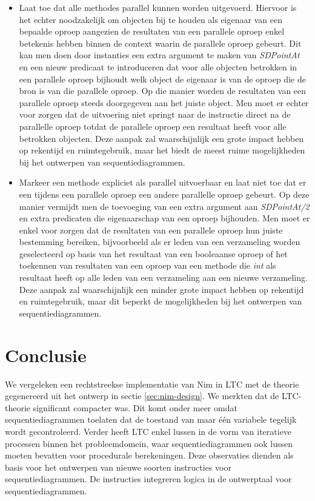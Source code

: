 \begin{itemize}
	\item Laat toe dat alle methodes parallel kunnen worden uitgevoerd. Hiervoor is het echter noodzakelijk om objecten bij te houden als eigenaar van een bepaalde oproep aangezien de resultaten van een parallele oproep enkel betekenis hebben binnen de context waarin de parallele oproep gebeurt. Dit kan men doen door instanties een extra argument te maken van \textit{SDPointAt} en een nieuw predicaat te introduceren dat voor alle objecten betrokken in een parallele oproep bijhoudt welk object de eigenaar is van de oproep die de bron is van die parallele oproep. Op die manier worden de resultaten van een parallele oproep steeds doorgegeven aan het juiste object. Men moet er echter voor zorgen dat de uitvoering niet springt naar de instructie direct na de parallelle oproep totdat de parallele oproep een resultaat heeft voor alle betrokken objecten. Deze aanpak zal waarschijnlijk een grote impact hebben op rekentijd en ruimtegebruik, maar het biedt de meest ruime mogelijkheden bij het ontwerpen van sequentiediagrammen.
	\item Markeer een methode expliciet als parallel uitvoerbaar en laat niet toe dat er een tijdens een parallele oproep een andere parallelle oproep gebeurt. Op deze manier vermijdt men de toevoeging van een extra argument aan \textit{SDPointAt/2} en extra predicaten die eigenaarschap van een oproep bijhouden. Men moet er enkel voor zorgen dat de resultaten van een parallele oproep hun juiste bestemming bereiken, bijvoorbeeld als er leden van een verzameling worden geselecteerd op basis van het resultaat van een booleaanse oproep of het toekennen van resultaten van een oproep van een methode die \textit{int} als resultaat heeft op alle leden van een verzameling aan een nieuwe verzameling. Deze aanpak zal waarschijnlijk een minder grote impact hebben op rekentijd en ruimtegebruik, maar dit beperkt de mogelijkheden bij het ontwerpen van sequentiediagrammen.
\end{itemize}

\section{Conclusie}

We vergeleken een rechtstreekse implementatie van Nim in LTC met de theorie gegenereerd uit het ontwerp in sectie \ref{sec:nim-design}. We merkten dat de LTC-theorie significant compacter was. Dit komt onder meer omdat sequentiediagrammen toelaten dat de toestand van maar \'e\'en variabele tegelijk wordt gecontroleerd. Verder heeft LTC enkel lussen in de vorm van iteratieve processen binnen het probleemdomein, waar sequentiediagrammen ook lussen moeten bevatten voor procedurale berekeningen. Deze observaties dienden als basis voor het ontwerpen van nieuwe soorten instructies voor sequentiediagrammen. De instructies integreren logica in de ontwerptaal voor sequentiediagrammen.

